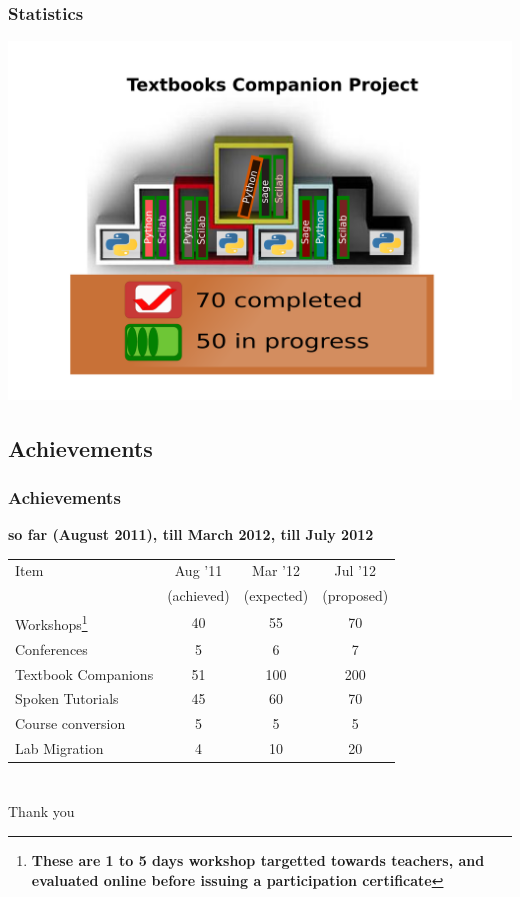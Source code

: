 \documentclass[compress,red]{beamer} %
\begin{document}
\begin{frame}
\frametitle{Statistics}
\begin{center}
\includegraphics[scale=.15]{textbook.png}
\end{center}
\end{frame}

\subsection{Achievements}
\begin{frame}
\frametitle{Achievements}
\small \bf
{\bf so far (August 2011), till March 2012, till July 2012}
\begin{center}
\begin{table}[h]
\begin{tabular}{|l|c|c|c|}
\hline 
Item & Aug '11 & Mar '12 & Jul '12 \tabularnewline
& (achieved) & (expected) & (proposed) \tabularnewline
\hline
\hline 
Workshops\footnote{\bf These are 1 to 5 days workshop targetted towards
\alert{teachers}, and \alert{evaluated online} before issuing a participation
certificate}  & 40 &  55 & 70\tabularnewline
\hline 
Conferences & 5 & 6 & 7 \tabularnewline
\hline 
Textbook Companions & 51 & 100 & 200 \tabularnewline
\hline 
Spoken Tutorials & 45 & 60 & 70 \tabularnewline
\hline 
Course conversion & 5 & 5 & 5\tabularnewline
\hline
Lab Migration & 4 & 10 & 20 \tabularnewline
\hline
\end{tabular}
\end{table}
\end{center}
\end{frame}

\section*{}
\begin{frame}
    \begin{center}
        \huge
        Thank you\\ \pause
    \end{center}
\end{frame}
\end{document}

